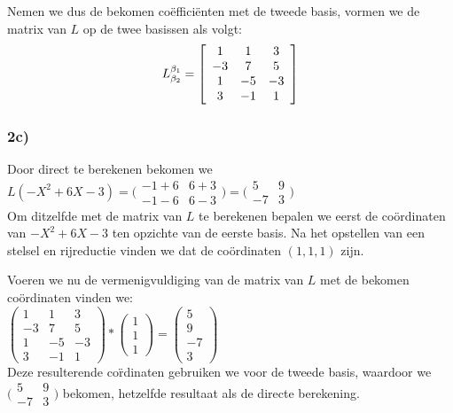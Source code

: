 \documentclass[lineaire_algebra_oplossingen.tex]{subfiles}
\begin{document}
Nemen we dus de bekomen co\"effici\"enten met de tweede basis, vormen we de matrix van $L$ op de twee basissen als volgt:\\

\[
L^{\beta_1}_{\beta_2} =
\left[
\begin{array}{c c c}
1 & 1 & 3\\
-3 & 7 & 5\\
1 & -5 & -3\\
3 & -1 & 1
\end{array}
\right]
\]

\subsubsection*{2c)}

Door direct te berekenen bekomen we\\

$ L(-X^2+6X-3) = \bigl(
\begin{smallmatrix}
-1+6&6+3\\ -1-6&6-3
\end{smallmatrix}\bigr) = \bigl(
\begin{smallmatrix}
5&9\\ -7&3
\end{smallmatrix}\bigr)$\\

Om ditzelfde met de matrix van $L$ te berekenen bepalen we eerst de co\"ordinaten van $-X^2+6X-3$ ten opzichte van de eerste basis.
Na het opstellen van een stelsel en rijreductie vinden we dat de co\"ordinaten $(1,1,1)$ zijn.

Voeren we nu de vermenigvuldiging van de matrix van $L$ met de bekomen co\"ordinaten vinden we:\\

$\begin{pmatrix}
1 & 1 & 3\\
-3 & 7 & 5\\
1 & -5 & -3\\
3 & -1 & 1
\end{pmatrix} * \begin{pmatrix}
1\\
1\\
1
\end{pmatrix} = \begin{pmatrix}
5\\
9\\
-7\\
3
\end{pmatrix}$\\

Deze resulterende co\"rdinaten gebruiken we voor de tweede basis, waardoor we $\bigl(
\begin{smallmatrix}
5&9\\ -7&3
\end{smallmatrix}\bigr)$ bekomen, hetzelfde resultaat als de directe berekening.
\end{document}
